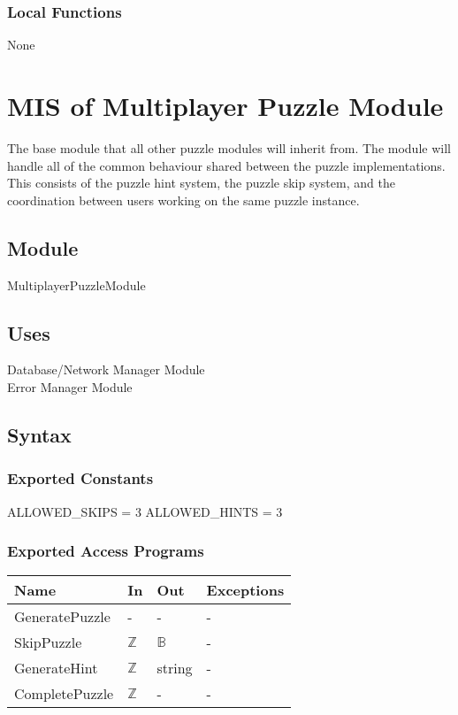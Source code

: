 \documentclass[12pt, titlepage]{article}
\begin{document}
\subsubsection{Local Functions}

None

\newpage

\section{MIS of {Multiplayer Puzzle Module}} \label{DocModule} 

The base module that all other puzzle modules will inherit from. The module will handle all of the common behaviour shared between the puzzle implementations. This consists of the puzzle hint system, the puzzle skip system, and the coordination between users working on the same puzzle instance. 

\subsection{Module}
MultiplayerPuzzleModule

\subsection{Uses}
Database/Network Manager Module\\
Error Manager Module

\subsection{Syntax}

\subsubsection{Exported Constants}
ALLOWED\_SKIPS = 3 \newline
\noindent ALLOWED\_HINTS = 3

\subsubsection{Exported Access Programs}

\begin{center}
\begin{tabular}{p{4cm} p{3cm} p{3cm} p{3cm}}
\hline
\textbf{Name} & \textbf{In} & \textbf{Out} & \textbf{Exceptions} \\
\hline
GeneratePuzzle & - & - & - \\
SkipPuzzle & $\mathds{Z}$ & $\mathds{B}$ & - \\
GenerateHint & $\mathds{Z}$ & string & - \\
CompletePuzzle & $\mathds{Z}$ & - & - \\
\hline
\end{tabular}
\end{center}
\end{document}
